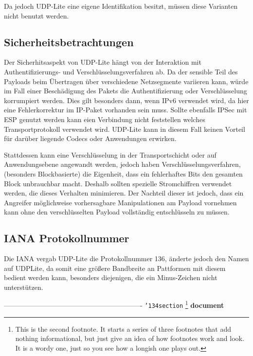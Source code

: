 \documentclass{template}
\begin{document}
Da jedoch UDP-Lite eine eigene Identifikation besitzt,
müssen diese Varianten nicht benutzt werden.


\subsection{Sicherheitsbetrachtungen}

Der Sicherhitsaspekt von UDP-Lite hängt von der Interaktion mit
Authentifizierungs- und Verschlüsselungsverfahren ab. Da der sensible
Teil des Payloads beim Übertragen über verschiedene Netzsegmente variieren
kann, würde im Fall einer Beschädigung des Pakets
die Authentifizierung oder Verschlüsselung korrumpiert werden.
Dies gilt besonders dann, wenn IPv6 verwendet wird, da hier eine Fehlerkorrektur
im IP-Paket vorhanden sein muss. Sollte ebenfalls IPSec mit ESP genutzt werden
kann eien Verbindung nicht feststellen welches Transportprotokoll
verwendet wird. UDP-Lite kann in diesem Fall keinen Vorteil für
darüber liegende Codecs oder Anwendungen erwirken.

Stattdessen kann eine Verschlüsselung in der Transportschicht oder auf
Anwendungsebene angewandt werden, jedoch haben Verschlüsselungsverfahren,
(besonders Blockbasierte) die Eigenheit, dass ein fehlerhaftes Bits
den gesamten Block unbrauchbar macht. Deshalb sollten spezielle
Stromchiffren verwendet werden, die dieses Verhalten minimieren.
Der Nachteil dieser ist jedoch, dass ein Angreifer möglichweise
vorhersagbare Manipulationen am Payload vornehmen kann ohne den
verschlüsselten Payload vollständig entschlüsseln zu müssen.



\subsection{IANA Protokollnummer}

Die IANA vergab UDP-Lite die Protokollnummer 136, änderte jedoch den
Namen auf UDPLite, da somit eine größere Bandbreite an Pattformen
mit diesem bedient werden kann, besonders diejenigen, die ein Minus-Zeichen
nicht unterstützen.








-------------------------------------------------------------
\texttt{{\char'134}section}
\footnote{This is the second footnote.  It
starts a series of three footnotes that add nothing
informational, but just give an idea of how footnotes work
and look. It is a wordy one, just so you see
how a longish one plays out.}
\textbf{document} 
\end{document}
